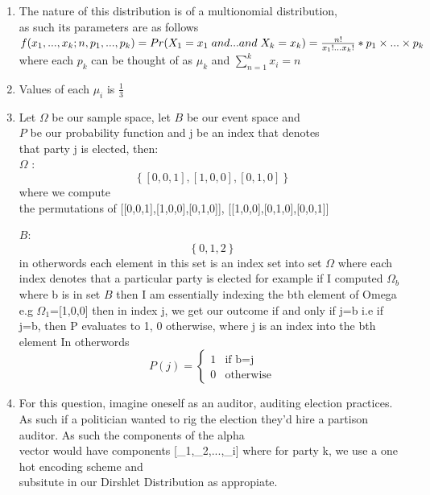 \documentclass{article}
\begin{document}
\begin{enumerate}
    \item The nature of this distribution is of a multionomial distribution,
    \\ as such its parameters are as follows
    \\ $f(x_{1},...,x_{k};n,p_{1},...,p_{k})= Pr(X_{1}=x_{1} \hspace{0.1cm} and ... and \hspace{0.1cm} X_{k}=x_{k})=\frac{n!}{x_{1}!...x_{k}!}*p_{1}\times...\times p_{k}$
    \\ where each $p_{k}$ can be thought of as $\mu_{k}$ and $\sum_{n=1}^{k} x_{i} = n$
    
    \item Values of each $\mu_{i} $ is $\frac{1}{3}$

    \item Let $\Omega$  be our sample space, let $ B$ be our event space and 
    \\ $P$ be our probability function and j be an index that denotes
    \\ that party j is elected, then:
    \\ $\Omega$ : \[\left\{[0,0,1],[1,0,0],[0,1,0]\right\}\] where we compute
    \\ the permutations of [[0,0,1],[1,0,0],[0,1,0]], [[1,0,0],[0,1,0],[0,0,1]]

     \par $B$: \[\left\{0,1,2\right\}\] 
     in otherwords each element in this set is an index
     set into set $\Omega$ where each index denotes that a particular party
     is elected for example if I computed $\Omega_{b}$ where b is in set $B$ 
     then I am essentially indexing the bth element of Omega e.g
     $\Omega_{1}$=[1,0,0] then in index j, we get our outcome if and only if
     j=b i.e if j=b, then P evaluates to 1, 0 otherwise, where j is an index
     into the bth element
     In otherwords
     \[ P(j) = 
        \begin{cases}
        	1 & \text{if b=j}\\
        	0 & \text{otherwise}
        \end{cases}
      
     \]
     
     \item For this question, imagine oneself as an auditor, auditing election practices. As such if a politician wanted to rig the election they'd hire a partison auditor. As such the components of the alpha
     \\vector would have components [\alpha_{1},\alpha_{2},...,\alpha_{i}] where for party k, we use a one hot encoding scheme and
     \\ subsitute in our Dirshlet Distribution as appropiate.


\end{enumerate}
\end{document}
